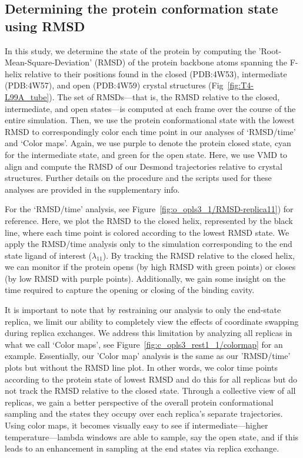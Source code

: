 \subsection{Determining the protein conformation state using RMSD}
In this study, we determine the state of the protein by computing the 'Root-Mean-Square-Deviation' (RMSD) of the protein backbone atoms spanning the F-helix relative to their positions found in the closed (PDB:4W53), intermediate (PDB:4W57), and open (PDB:4W59) crystal structures (Fig~\ref{fig:T4-L99A_tube}).
The set of RMSDs---that is, the RMSD relative to the closed, intermediate, and open states---is computed at each frame over the course of the entire simulation.
Then, we use the protein conformational state with the lowest RMSD to correspondingly color each time point in our analyses of `RMSD/time' and `Color maps'.
Again, we use purple to denote the protein closed state, cyan for the intermediate state, and green for the open state.
Here, we use VMD \cite{VMDpaper,VMDalignment} to align and compute the RMSD of our Desmond trajectories relative to crystal structures.
Further details on the procedure and the scripts used for these analyses are provided in the supplementary info.

For the `RMSD/time' analysis, see Figure~\ref{fig:o_opls3_1/RMSD-replica11}) for reference.
Here, we plot the RMSD to the closed helix, represented by the black line, where each time point is colored according to the lowest RMSD state.
We apply the RMSD/time analysis only to the simulation corresponding to the end state ligand of interest ($\lambda_{11}$).
By tracking the RMSD relative to the closed helix, we can monitor if the protein opens (by high RMSD with green points) or closes (by low RMSD with purple points).
Additionally, we gain some insight on the time required to capture the opening or closing of the binding cavity.

It is important to note that by restraining our analysis to only the end-state replica, we limit our ability to completely view the effects of coordinate swapping during replica exchanges.
We address this limitation by analyzing all replicas in what we call `Color maps', see Figure~\ref{fig:c_opls3_rest1_1/colormap} for an example.
Essentially, our 'Color map' analysis is the same as our 'RMSD/time' plots but without the RMSD line plot.
In other words, we color time points according to the protein state of lowest RMSD and do this for all replicas but do not track the RMSD relative to the closed state.
Through a collective view of all replicas, we gain a better perspective of the overall protein conformational sampling and the states they occupy over each replica's separate trajectories.
Using color maps, it becomes visually easy to see if intermediate---higher temperature---lambda windows are able to sample, say the open state, and if this leads to an enhancement in sampling at the end states via replica exchange.

